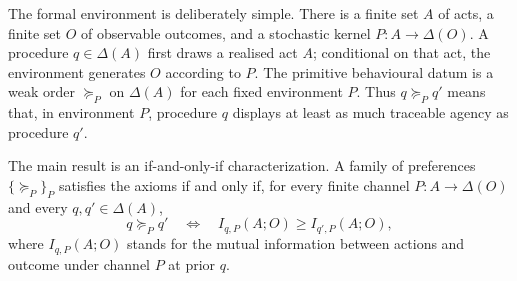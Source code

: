 \documentclass[11pt,a4paper]{article}
\theoremstyle{definition}
\newcommand{\1}{\mathbf 1}
\begin{document}

The formal environment is deliberately simple.  There is a finite set $A$ of acts, a finite set $O$ of observable outcomes, and a stochastic kernel $P:A\to\Delta(O)$.  A procedure $q\in\Delta(A)$ first draws a realised act $A$; conditional on that act, the environment generates $O$ according to $P$.  The primitive behavioural datum is a weak order $\succeq_P$ on $\Delta(A)$ for each fixed environment $P$.  Thus $q\succeq_P q'$ means that, in environment
$P$, procedure $q$ displays at least as much traceable agency as procedure $q'$.

The main result is an if-and-only-if characterization.  A family of preferences $\{\succeq_P\}_P$ satisfies the axioms if and only if, for every finite channel $P:A\to\Delta(O)$ and every $q,q'\in\Delta(A)$,
\[
q\succeq_P q'
\quad\Longleftrightarrow\quad
I_{q,P}(A;O)\ge I_{q',P}(A;O),
\]
where $I_{q,P}(A;O)$ stands for the mutual information between actions and outcome under channel $P$ at prior $q$.


\end{document}

